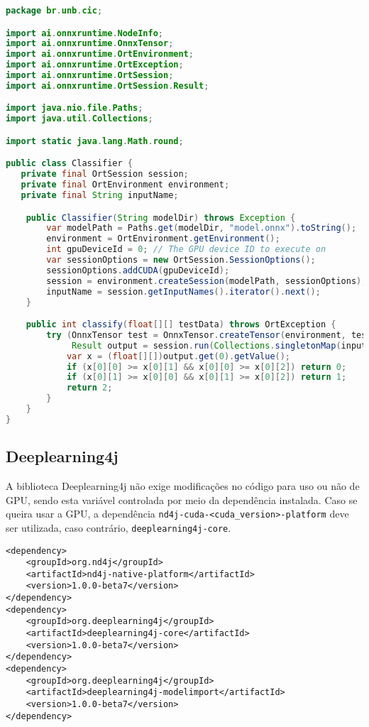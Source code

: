 \begin{lstlisting}[language=Java, caption=Classificador implementado em Java utilizando ONNX Runtime com GPU]
package br.unb.cic;

import ai.onnxruntime.NodeInfo;
import ai.onnxruntime.OnnxTensor;
import ai.onnxruntime.OrtEnvironment;
import ai.onnxruntime.OrtException;
import ai.onnxruntime.OrtSession;
import ai.onnxruntime.OrtSession.Result;

import java.nio.file.Paths;
import java.util.Collections;

import static java.lang.Math.round;

public class Classifier {
   private final OrtSession session;
   private final OrtEnvironment environment;
   private final String inputName;

    public Classifier(String modelDir) throws Exception {
        var modelPath = Paths.get(modelDir, "model.onnx").toString();
        environment = OrtEnvironment.getEnvironment();
        int gpuDeviceId = 0; // The GPU device ID to execute on
        var sessionOptions = new OrtSession.SessionOptions();
        sessionOptions.addCUDA(gpuDeviceId);
        session = environment.createSession(modelPath, sessionOptions);
        inputName = session.getInputNames().iterator().next();
    }

    public int classify(float[][] testData) throws OrtException {
        try (OnnxTensor test = OnnxTensor.createTensor(environment, testData);
             Result output = session.run(Collections.singletonMap(inputName, test))) {
            var x = (float[][])output.get(0).getValue();
            if (x[0][0] >= x[0][1] && x[0][0] >= x[0][2]) return 0;
            if (x[0][1] >= x[0][0] && x[0][1] >= x[0][2]) return 1;
            return 2;
        }
    }
}
\end{lstlisting}

\subsection{Deeplearning4j}

A biblioteca Deeplearning4j não exige modificações no código para uso ou não de GPU, sendo esta variável controlada por meio da dependência instalada. Caso se queira usar a GPU, a dependência \texttt{nd4j-cuda-<cuda\_version>-platform} deve ser utilizada, caso contrário, \texttt{deeplearning4j-core}.

\begin{lstlisting}[caption=Dependências Maven para uso de Deeplearning4j sem GPU]
<dependency>
    <groupId>org.nd4j</groupId>
    <artifactId>nd4j-native-platform</artifactId>
    <version>1.0.0-beta7</version>
</dependency>
<dependency>
    <groupId>org.deeplearning4j</groupId>
    <artifactId>deeplearning4j-core</artifactId>
    <version>1.0.0-beta7</version>
</dependency>
<dependency>
    <groupId>org.deeplearning4j</groupId>
    <artifactId>deeplearning4j-modelimport</artifactId>
    <version>1.0.0-beta7</version>
</dependency>
\end{lstlisting}

